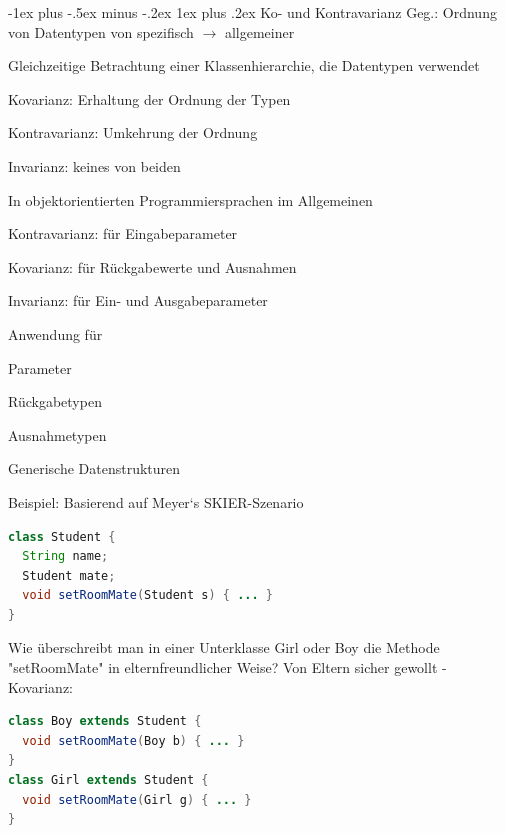 \documentclass[10pt]{article}
\makeatletter
\renewcommand{\subsubsection}{\@startsection{subsubsection}{3}{0mm}%
                                {-1ex plus -.5ex minus -.2ex}%
                                {1ex plus .2ex}%
                                {\normalfont\small\bfseries}}
\makeatother
\begin{document}
\subsubsection{Ko- und Kontravarianz}
Geg.: Ordnung von Datentypen von spezifisch $\rightarrow$ allgemeiner

\begin{itemize*}
  \item Gleichzeitige Betrachtung einer Klassenhierarchie, die Datentypen verwendet
  \begin{itemize*}
    \item Kovarianz: Erhaltung der Ordnung der Typen
    \item Kontravarianz: Umkehrung der Ordnung
    \item Invarianz: keines von beiden
  \end{itemize*}
  \item In objektorientierten Programmiersprachen im Allgemeinen
  \begin{itemize*}
    \item Kontravarianz: für Eingabeparameter
    \item Kovarianz: für Rückgabewerte und Ausnahmen
    \item Invarianz: für Ein- und Ausgabeparameter
  \end{itemize*}
  \item Anwendung für
  \begin{itemize*}
    \item Parameter
    \item Rückgabetypen
    \item Ausnahmetypen
    \item Generische Datenstrukturen
  \end{itemize*}
\end{itemize*}

Beispiel: Basierend auf Meyer‘s SKIER-Szenario
\begin{lstlisting}[language=java]
class Student {
  String name;
  Student mate;
  void setRoomMate(Student s) { ... }
}
\end{lstlisting}

Wie überschreibt man in einer Unterklasse Girl oder Boy die Methode "setRoomMate" in elternfreundlicher Weise? Von Eltern sicher gewollt - Kovarianz:
\begin{lstlisting}[language=java]
class Boy extends Student {
  void setRoomMate(Boy b) { ... }
}
class Girl extends Student {
  void setRoomMate(Girl g) { ... }
}
\end{lstlisting}
\end{document}

